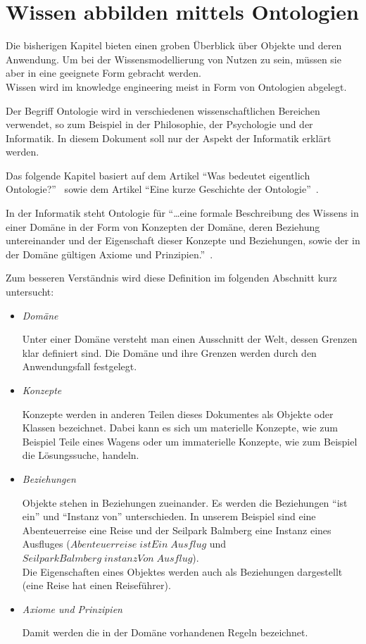 \chapter{Wissen abbilden mittels Ontologien}
\label{chap:ontologien}

Die bisherigen Kapitel bieten einen groben Überblick über Objekte und deren Anwendung. Um bei der Wissensmodellierung von Nutzen zu sein, müssen sie aber in eine geeignete Form gebracht werden.\\
Wissen wird im knowledge engineering meist in Form von Ontologien abgelegt.

Der Begriff Ontologie wird in verschiedenen wissenschaftlichen Bereichen verwendet, so zum Beispiel in der Philosophie, der Psychologie und der Informatik. In diesem Dokument soll nur der Aspekt der Informatik erklärt werden.

Das folgende Kapitel basiert auf dem Artikel ``Was bedeutet eigentlich Ontologie?''~\cite{IspekOntoBedeutung} sowie dem Artikel ``Eine kurze Geschichte der Ontologie''~\cite{ISpekOntoGeschichte}.

In der Informatik steht Ontologie für ``\ldots eine formale Beschreibung des Wissens in einer Domäne in der Form von Konzepten der Domäne, deren Beziehung untereinander und der Eigenschaft dieser Konzepte und Beziehungen, sowie der in der Domäne gültigen Axiome und Prinzipien.''~\cite[S. 310]{ISpekOntoGeschichte}.

Zum besseren Verständnis wird diese Definition im folgenden Abschnitt kurz untersucht:
\begin{itemize}
    \item \textit{Domäne}

        Unter einer Domäne versteht man einen Ausschnitt der Welt, dessen Grenzen klar definiert sind. Die Domäne und ihre Grenzen werden durch den Anwendungsfall festgelegt.

    \item \textit{Konzepte}

        Konzepte werden in anderen Teilen dieses Dokumentes als Objekte oder Klassen bezeichnet. Dabei kann es sich um materielle Konzepte, wie zum Beispiel Teile eines Wagens oder um immaterielle Konzepte, wie zum Beispiel die Lösungssuche, handeln.

    \item \textit{Beziehungen}

        Objekte stehen in Beziehungen zueinander. Es werden die Beziehungen ``ist ein'' und ``Instanz von'' unterschieden. In unserem Beispiel sind eine Abenteuerreise eine Reise und der Seilpark Balmberg eine Instanz eines Ausfluges ($Abenteuerreise\;istEin\;Ausflug$ und $SeilparkBalmberg\;instanzVon\;Ausflug$).\\
        Die Eigenschaften eines Objektes werden auch als Beziehungen dargestellt (eine Reise hat einen Reiseführer).

    \item \textit{Axiome und Prinzipien}

        Damit werden die in der Domäne vorhandenen Regeln bezeichnet.
\end{itemize}

